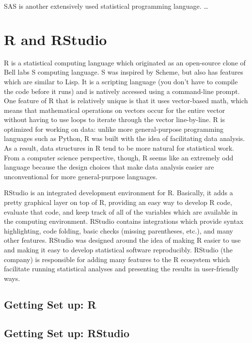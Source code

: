 \documentclass[]{book}
\begin{document}
SAS is another extensively used statistical programming language. \ldots{}

\hypertarget{r-and-rstudio}{%
\section{R and RStudio}\label{r-and-rstudio}}

R is a statistical computing language which originated as an open-source clone of Bell labs S computing language. S was inspired by Scheme, but also has features which are similar to Lisp. It is a scripting language (you don't have to compile the code before it runs) and is natively accessed using a command-line prompt. One feature of R that is relatively unique is that it uses vector-based math, which means that mathematical operations on vectors occur for the entire vector without having to use loops to iterate through the vector line-by-line. R is optimized for working on data: unlike more general-purpose programming languages such as Python, R was built with the idea of facilitating data analysis. As a result, data structures in R tend to be more natural for statistical work. From a computer science perspective, though, R seems like an extremely odd language because the design choices that make data analysis easier are unconventional for more general-purpose languages.

RStudio is an integrated development environment for R. Basically, it adds a pretty graphical layer on top of R, providing an easy way to develop R code, evaluate that code, and keep track of all of the variables which are available in the computing environment. RStudio contains integrations which provide syntax highlighting, code folding, basic checks (missing parentheses, etc.), and many other features. RStudio was designed around the idea of making R easier to use and making it easy to develop statistical software reproducibly. RStudio (the company) is responsible for adding many features to the R ecosystem which facilitate running statistical analyses and presenting the results in user-friendly ways.

\hypertarget{getting-set-up-r}{%
\subsection{Getting Set up: R}\label{getting-set-up-r}}

\hypertarget{getting-set-up-rstudio}{%
\subsection{Getting Set up: RStudio}\label{getting-set-up-rstudio}}
\end{document}
